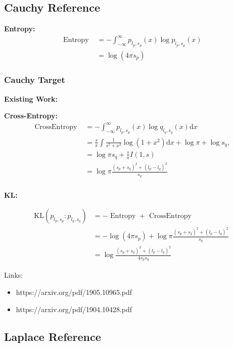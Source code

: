 \documentclass{article}
\begin{document}
\subsection{Cauchy Reference}

\noindent \textbf{Entropy:}
$$ \begin{aligned} \text { Entropy } &=-\int_{-\infty}^{\infty} p_{l_{p}, s_{p}}(x) \log p_{l_{p}, s_{p}}(x)\\
&=\log (4 \pi s_{p})\end{aligned} $$

\subsubsection{Cauchy Target}

\noindent \textbf{Existing Work:}

\noindent \textbf{Cross-Entropy:}
$$ \begin{aligned} \text { CrossEntropy }&=-\int_{-\infty}^{\infty} p_{l_{p}, s_{p}}(x) \log q_{l_{q}, s_{q}}(x) \mathrm{d} x\\& =\frac{s}{\pi} \int \frac{1}{s^{2}+x^{2}} \log \left(1+x^{2}\right) \mathrm{d} x+\log \pi+\log s_{q}, \\
&=\log \pi s_{q}+\frac{s}{\pi} I(1, s) \\
&=\log \pi \frac{\left(s_{p}+s_{q}\right)^{2}+\left(l_{p}-l_{q}\right)^{2}}{s_{q}}\\
\end{aligned} $$

\noindent \textbf{KL:}

$$ \begin{aligned}\mathrm{KL}\left(p_{l_{p}, s_{p}}: p_{l_{q}, s_{q}}\right)&=-\text { Entropy }+\text { CrossEntropy } \\&=-\log (4 \pi s_{p})+\log \pi \frac{\left(s_{p}+s_{q}\right)^{2}+\left(l_{p}-l_{q}\right)^{2}}{s_{q}}\\&=\log\frac{\left(s_{p}+s_{q}\right)^{2}+\left(l_{p}-l_{q}\right)^{2}}{4 s_{p} s_{q}}\end{aligned} $$

Links:
\begin{itemize}
    \item https://arxiv.org/pdf/1905.10965.pdf
    \item https://arxiv.org/pdf/1904.10428.pdf
\end{itemize}

\subsection{Laplace Reference}
\end{document}
